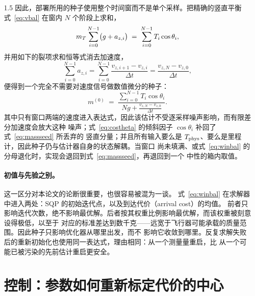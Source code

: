 \begin{spacing}{1.5}
因此，部署所用的种子使用整个时间窗而不是单个采样。把精确的竖直平衡式~\eqref{eq:vbal} 在窗内
$N$ 个阶段上求和，
\begin{equation}
m_T \sum_{i=0}^{N-1}\bigl(g + a_{z,i}\bigr) \;=\; \sum_{i=0}^{N-1} T_i \cos\theta_i ,
\label{eq:winbal1}
\end{equation}
并用如下的裂项求和恒等式消去加速度，
\begin{equation}
\sum_{i=0}^{N-1} a_{z,i}
= \sum_{i=0}^{N-1} \frac{v_{z,i+1}-v_{z,i}}{\Delta t}
= \frac{v_{z,N}-v_{z,0}}{\Delta t},
\label{eq:telescope}
\end{equation}
便得到一个完全不需要对速度信号做数值微分的种子：
\begin{equation}
m^{(0)} \;=\; \frac{\displaystyle\sum_{i=0}^{N-1} T_i \cos\theta_i}
                   {\displaystyle N g + \frac{v_{z,N}-v_{z,0}}{\Delta t}} .
\label{eq:winbal}
\end{equation}
其中只有窗口两端的速度进入表达式，因此该估计不受逐采样噪声影响，而有限差分加速度会放大这种
噪声；式~\eqref{eq:costheta} 的倾斜因子 $\cos\theta_i$ 补回了式~\eqref{eq:massseed} 所丢弃的
竖直分量；并且所有输入要么是 $T_{\mathrm{phys}}$、要么是里程计，因此种子仍与估计器自身的状态解耦。当窗口
尚未填满、或式~\eqref{eq:winbal} 的分母退化时，实现会退回到式~\eqref{eq:massseed}，再退回到一个
中性的箱内取值。

\paragraph{初值与先验之别。}这一区分对本论文的论断很重要，也很容易被混为一谈。
式~\eqref{eq:winbal} 在求解器中进入两处：SQP 的初始迭代点，以及到达代价（arrival cost）的均值。
前者只影响迭代次数，绝不影响最优解。后者按其权重比例影响最优解，而该权重被刻意设得极低，以至于
对应的标准差达到数千克——远宽于飞行器可能承载的质量范围。因此种子只影响优化器从哪里出发，而不
影响它收敛到哪里。反复求解失败后的重新初始化也使用同一表达式，理由相同：从一个测量量重启，比
从一个可能已被污染的先前估计重启更安全。

\section{控制：参数如何重新标定代价的中心}\label{sec:model:ctrl}


\end{spacing}
